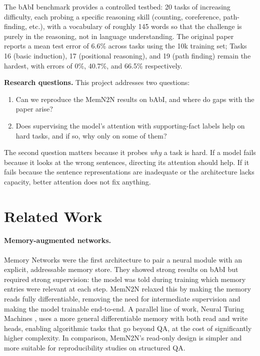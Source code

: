 \documentclass{article} %
\begin{document}
The bAbI benchmark \citep{weston2015towards} provides a controlled testbed: 20 tasks of increasing difficulty, each probing a specific reasoning skill (counting, coreference, path-finding, etc.), with a vocabulary of roughly 145 words so that the challenge is purely in the reasoning, not in language understanding. The original paper reports a mean test error of 6.6\% across tasks using the 10k training set; Tasks 16 (basic induction), 17 (positional reasoning), and 19 (path finding) remain the hardest, with errors of 0\%, 40.7\%, and 66.5\% respectively.

\textbf{Research questions.} This project addresses two questions:
\begin{enumerate}
  \item Can we reproduce the MemN2N results on bAbI, and where do gaps with the paper arise?
  \item Does supervising the model's attention with supporting-fact labels help on hard tasks, and if so, why only on some of them?
\end{enumerate}

The second question matters because it probes \emph{why} a task is hard. If a model fails because it looks at the wrong sentences, directing its attention should help. If it fails because the sentence representations are inadequate or the architecture lacks capacity, better attention does not fix anything.


\section{Related Work}
\label{sec:related}

\paragraph{Memory-augmented networks.}
Memory Networks \citep{weston2014memory} were the first architecture to pair a neural module with an explicit, addressable memory store. They showed strong results on bAbI but required strong supervision: the model was told during training which memory entries were relevant at each step. MemN2N \citep{sukhbaatar2015end} relaxed this by making the memory reads fully differentiable, removing the need for intermediate supervision and making the model trainable end-to-end. A parallel line of work, Neural Turing Machines \citep{graves2014neural}, uses a more general differentiable memory with both read and write heads, enabling algorithmic tasks that go beyond QA, at the cost of significantly higher complexity. In comparison, MemN2N's read-only design is simpler and more suitable for reproducibility studies on structured QA.
\end{document}
